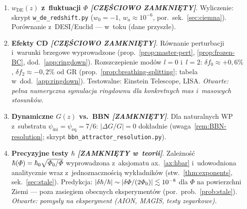 \begin{enumerate}[label=\textbf{O\arabic*}., start=5, nosep]
  \item \textbf{$w_{\mathrm{DE}}(z)$ z~fluktuacji $\Phi$
        \emph{[CZ\k{E}\'SCIOWO ZAMKNI\k{E}TY]}}.
        Wyliczenie: skrypt \texttt{w\_de\_redshift.py} ($w_0 = -1$,
        $w_a \approx 10^{-6}$, por.\ sek.~\ref{sec:ciemna}).
        Por\'ownanie z~DESI/Euclid --- w~toku (dane przysz\l{}e).

  \item \textbf{Efekty CD
        \emph{[CZ\k{E}\'SCIOWO ZAMKNI\k{E}TY]}}.
        R\'ownanie perturbacji i~warunki brzegowe wyprowadzone
        (prop.~\ref{prop:master-pert}, \ref{prop:frozen-BC},
        dod.~\ref{app:ringdown}).
        Rozszczepienie mod\'ow $l{=}0$ i~$l{=}2$:
        $\delta f_0 \approx +0{,}6\%$, $\delta f_2 \approx -0{,}2\%$
        od GR (prop.~\ref{prop:breathing-splitting}; tabela w~dod.~\ref{app:ringdown}).
        Testowalne: Einstein Telescope, LISA.
        \emph{Otwarte: pe\l{}na numeryczna symulacja ringdownu dla
        konkretnych mas i~masowych stosunk\'ow.}

  \item \textbf{Dynamiczne $G(z)$ vs.\ BBN
        \emph{[ZAMKNI\k{E}TY]}}.
        Dla naturalnych WP z~substratu $\psi_{\mathrm{ini}}
        = \psi_{\mathrm{eq}} = 7/6$: $|\Delta G/G| = 0$ dok\l{}adnie
        (uwaga~\ref{rem:BBN-resolution}; skrypt
        \texttt{bbn\_attractor\_resolution.py}).

  \item \textbf{Precyzyjne testy $\hbar$
        \emph{[ZAMKNI\k{E}TY w~teorii]}}.
        Zale\.zno\'s\'c $\hbar(\varPhi) = \hbar_0 \sqrt{\varPhi_0/\varPhi}$
        wyprowadzona z~aksjomatu ax.~\ref{ax:hbar} i~udowodniona
        analitycznie wraz z~jednoznaczno\'sci\k{a} wyk\l{}adnik\'ow
        (stw.~\ref{thm:exponents}, sek.~\ref{sec:stale}).
        Predykcja: $|\delta\hbar/\hbar| \sim
        |\delta\varPhi/(2\varPhi_0)| \lesssim 10^{-8}$
        dla $\Phi$ na powierzchni Ziemi --- poza zasiegiem
        obecnych eksperyment\'ow (por.\ prob.~\ref{prob:stale}).
        \emph{Otwarte: pomys\l{}y na eksperyment
        (AION, MAGIS, testy zegarkowe).}
\end{enumerate}

